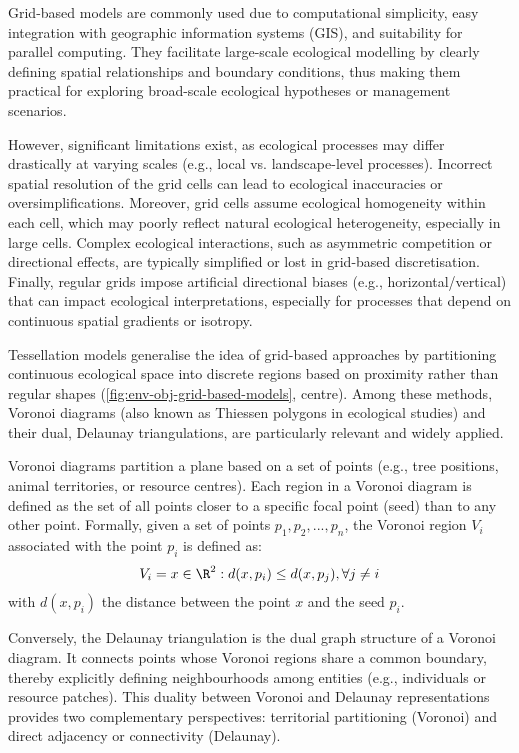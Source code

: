Grid-based models are commonly used due to computational simplicity, easy integration with geographic information systems (GIS), and suitability for parallel computing. They facilitate large-scale ecological modelling by clearly defining spatial relationships and boundary conditions, thus making them practical for exploring broad-scale ecological hypotheses or management scenarios.

However, significant limitations exist, as ecological processes may differ drastically at varying scales (e.g., local vs. landscape-level processes). Incorrect spatial resolution of the grid cells can lead to ecological inaccuracies or oversimplifications. Moreover, grid cells assume ecological homogeneity within each cell, which may poorly reflect natural ecological heterogeneity, especially in large cells. Complex ecological interactions, such as asymmetric competition or directional effects, are typically simplified or lost in grid-based discretisation. Finally, regular grids impose artificial directional biases (e.g., horizontal/vertical) that can impact ecological interpretations, especially for processes that depend on continuous spatial gradients or isotropy.


Tessellation models generalise the idea of grid-based approaches by partitioning continuous ecological space into discrete regions based on proximity rather than regular shapes (\cref{fig:env-obj-grid-based-models}, centre). Among these methods, Voronoi diagrams (also known as Thiessen polygons in ecological studies) and their dual, Delaunay triangulations, are particularly relevant and widely applied.

Voronoi diagrams partition a plane based on a set of points (e.g., tree positions, animal territories, or resource centres). Each region in a Voronoi diagram is defined as the set of all points closer to a specific focal point (seed) than to any other point. Formally, given a set of points ${p_1, p_2, ..., p_n}$, the Voronoi region $V_i$ associated with the point $p_i$ is defined as:
\begin{align}
V_i = { x \in \R^2 : d(x, p_i) \leq d(x, p_j), \forall j \neq i }
\end{align}
with $d(x, p_i)$ the distance between the point $x$ and the seed $p_i$.

Conversely, the Delaunay triangulation is the dual graph structure of a Voronoi diagram. It connects points whose Voronoi regions share a common boundary, thereby explicitly defining neighbourhoods among entities (e.g., individuals or resource patches). This duality between Voronoi and Delaunay representations provides two complementary perspectives: territorial partitioning (Voronoi) and direct adjacency or connectivity (Delaunay).

